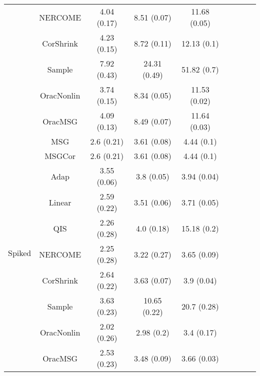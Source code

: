 \documentclass[useAMS,referee,usenatbib]{biom}
\begin{document}
\begin{table}[H]
{\begin{tabular}{ccccccccc}
 & NERCOME        & 4.04 (0.17) & 8.51 (0.07)  & 11.68 (0.05) \\
 & CorShrink      & 4.23 (0.15) & 8.72 (0.11)  & 12.13 (0.1)  \\
 & Sample            & 7.92 (0.43) & 24.31 (0.49) & 51.82 (0.7)  \\
 & OracNonlin & 3.74 (0.15) & 8.34 (0.05)  & 11.53 (0.02) \\
 & OracMSG  & 4.09 (0.13) & 8.49 (0.07)  & 11.64 (0.03) \\  \midrule
\multirow{10}{*}{Spiked}  
 & MSG & 2.6 (0.21)  & 3.61 (0.08)  & 4.44 (0.1)  \\
 & MSGCor   & 2.6 (0.21)  & 3.61 (0.08)  & 4.44 (0.1)  \\
 & Adap     & 3.55 (0.06) & 3.8 (0.05)   & 3.94 (0.04) \\
 & Linear         & 2.59 (0.22) & 3.51 (0.06)  & 3.71 (0.05) \\
 & QIS            & 2.26 (0.28) & 4.0 (0.18)   & 15.18 (0.2) \\
 & NERCOME        & 2.25 (0.28) & 3.22 (0.27)  & 3.65 (0.09) \\
 & CorShrink      & 2.64 (0.22) & 3.63 (0.07)  & 3.9 (0.04)  \\
 & Sample            & 3.63 (0.23) & 10.65 (0.22) & 20.7 (0.28) \\
 & OracNonlin & 2.02 (0.26) & 2.98 (0.2)   & 3.4 (0.17)  \\
 & OracMSG  & 2.53 (0.23) & 3.48 (0.09)  & 3.66 (0.03) \\ \bottomrule
\end{tabular}%
}
\end{table}
\end{document}
